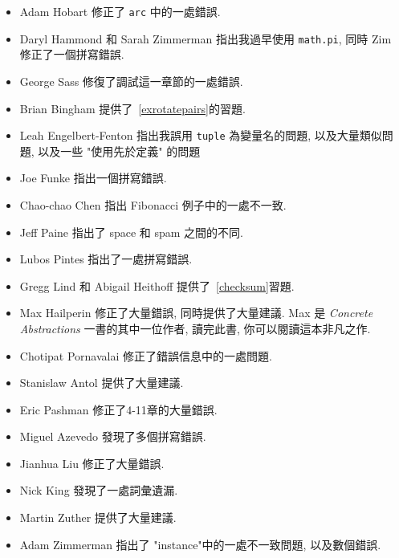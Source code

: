 \documentclass[10pt]{book}
\begin{document}
\begin{itemize}
\item Adam Hobart 修正了 {\tt arc} 中的一處錯誤. 

\item Daryl Hammond 和 Sarah Zimmerman 指出我過早使用 {\tt math.pi}, 
同時 Zim 修正了一個拼寫錯誤. 

\item George Sass 修復了調試這一章節的一處錯誤. 

\item Brian Bingham 提供了~\ref{exrotatepairs}的習題. 

\item Leah Engelbert-Fenton 指出我誤用 {\tt tuple} 為變量名的問題, 
以及大量類似問題, 以及一些 "使用先於定義" 的問題

\item Joe Funke 指出一個拼寫錯誤. 

\item Chao-chao Chen 指出 Fibonacci 例子中的一處不一致. 

\item Jeff Paine 指出了 space 和 spam 之間的不同. 

\item Lubos Pintes 指出了一處拼寫錯誤. 

\item Gregg Lind 和 Abigail Heithoff 提供了~\ref{checksum}習題. 

\item Max Hailperin 修正了大量錯誤, 同時提供了大量建議. 
Max 是 {\em Concrete Abstractions} 一書的其中一位作者, 讀完此書, 
你可以閱讀這本非凡之作. 

\item Chotipat Pornavalai 修正了錯誤信息中的一處問題. 

\item Stanislaw Antol 提供了大量建議. 

\item Eric Pashman 修正了4-11章的大量錯誤. 

\item Miguel Azevedo 發現了多個拼寫錯誤. 

\item Jianhua Liu 修正了大量錯誤. 

\item Nick King 發現了一處詞彙遺漏. 

\item Martin Zuther 提供了大量建議. 

\item Adam Zimmerman 指出了 "instance"中的一處不一致問題, 以及數個錯誤. 


\end{itemize}
\end{document}
